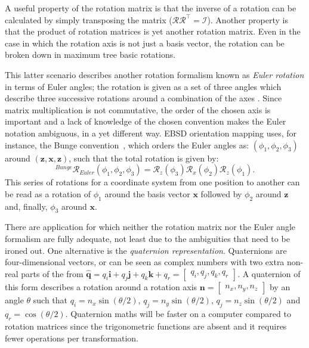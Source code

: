 A useful property of the rotation matrix is that the inverse of a rotation can be calculated by simply transposing the matrix ($\mathcal{R} \mathcal{R}^\intercal  = \mathcal{I}$). Another property is that the product of rotation matrices is yet another rotation matrix. Even in the case in which the rotation axis is not just a basis vector, the rotation can be broken down in maximum tree basic rotations. 

This latter scenario describes another rotation formalism known as \textit{Euler rotation} in terms of Euler angles; the rotation is given as a set of three angles which describe three successive rotations around a combination of the axes . Since matrix multiplication is not commutative, the order of the chosen axis is important and a lack of knowledge of the chosen convention makes the Euler notation ambiguous, in a yet different way. EBSD orientation mapping uses, for instance, the Bunge convention~\cite{Bunge}, which orders the Euler angles as: $(\phi_1, \phi_2, \phi_3)$ around $(\mathbf{z}, \mathbf{x}, \mathbf{z})$, such that the total rotation is given by:
\begin{equation*}
^{Bunge}\mathcal{R}_{Euler}(\phi_1, \phi_2, \phi_3) = \mathcal{R}_z(\phi_3) \mathcal{R}_x(\phi_2) \mathcal{R}_z(\phi_1).
\end{equation*}
This series of rotations for a coordinate system from one position to another can be read as a rotation of $\phi_1$ around the basis vector $\mathbf{x}$ followed by  $\phi_2$ around  $\mathbf{z}$ and, finally, $\phi_3$ around $\mathbf{x}$. 

There are application for which neither the rotation matrix nor the Euler angle formalism are fully adequate, not least due to the ambiguities that need to be ironed out. One alternative is the \textit{quaternion representation}. Quaternions are four-dimensional vectors, or can be seen as complex numbers with two extra non-real parts of the from $\hat{\mathbf{q}}=q_i \mathbf{i} + q_j \mathbf{j} +q_k \mathbf{k} +q_r= \begin{bmatrix}q_i, q_j, q_k, q_r \end{bmatrix}$. A quaternion of this form describes a rotation around a rotation axis $\mathbf{n} = \begin{bmatrix} n_x, n_y, n_z\end{bmatrix}$ by an angle $\theta$ such that $q_i=n_x \sin{(\theta/2)}$, $q_j=n_y \sin{(\theta/2)}$, $q_j=n_z \sin{(\theta/2)}$ and $q_r= \cos{(\theta/2)}$. Quaternion maths will be faster on a computer compared to rotation matrices since the trigonometric functions are absent and it requires fewer operations per transformation. 

